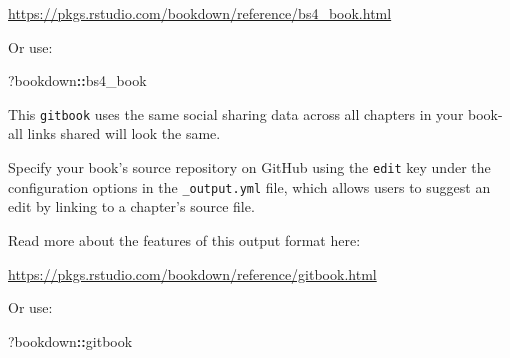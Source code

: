 \documentclass[
]{book}
\newenvironment{Shaded}{\begin{snugshade}}{\end{snugshade}}
\newcommand{\NormalTok}[1]{#1}
\newcommand{\SpecialCharTok}[1]{\textcolor[rgb]{0.81,0.36,0.00}{\textbf{#1}}}
\theoremstyle{definition}
\theoremstyle{definition}
\theoremstyle{definition}
\theoremstyle{definition}
\theoremstyle{remark}
\begin{document}
\url{https://pkgs.rstudio.com/bookdown/reference/bs4_book.html}

Or use:

\begin{Shaded}
\begin{Highlighting}[]
\NormalTok{?bookdown}\SpecialCharTok{::}\NormalTok{bs4\_book}
\end{Highlighting}
\end{Shaded}

This \texttt{gitbook} uses the same social sharing data across all chapters in your book- all links shared will look the same.

Specify your book's source repository on GitHub using the \texttt{edit} key under the configuration options in the \texttt{\_output.yml} file, which allows users to suggest an edit by linking to a chapter's source file.

Read more about the features of this output format here:

\url{https://pkgs.rstudio.com/bookdown/reference/gitbook.html}

Or use:

\begin{Shaded}
\begin{Highlighting}[]
\NormalTok{?bookdown}\SpecialCharTok{::}\NormalTok{gitbook}
\end{Highlighting}
\end{Shaded}



\end{document}
